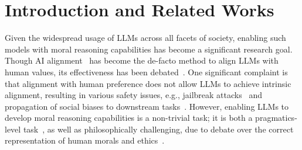 \section{Introduction and Related Works}
Given the widespread usage of LLMs across all facets of society, enabling such models with moral reasoning capabilities has become a significant research goal. Though AI alignment~\cite{bai2022training} has become the de-facto method to align LLMs with human values, its effectiveness has been debated~\cite{lin2023unlocking,qi2024safety}.
One significant complaint is that alignment with human preference does not allow LLMs to achieve intrinsic alignment, resulting in various safety issues, e.g., jailbreak attacks~\cite{xie2023defending} and propagation of social biases to downstream tasks~\cite{liu-etal-2024-intrinsic}.
However, enabling LLMs to develop moral reasoning capabilities is a non-trivial task; it is both a pragmatics-level task~\cite{awad2022computational}, as well as philosophically challenging, due to debate over the correct representation of human morals and ethics~\cite{zhixuan2024preferencesaialignment}.

